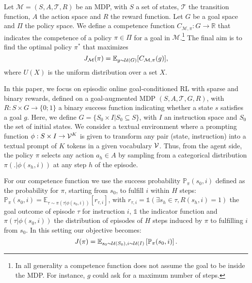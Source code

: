Let $\mathcal{M}=(S, A, \mathcal{T}, R)$ be an MDP, with $S$ a set of states, $\mathcal{T}$ the transition function, $A$ the action space and $R$ the reward function. Let $G$ be a goal space and $\Pi$ the policy space. We define a competence function $C_{\mathcal{M},\pi}: G %
\rightarrow \mathbb{R}$ that indicates the competence of a policy $\pi \in \Pi$ for a goal in $\mathcal{M}$.\footnote{In all generality a competence function does not assume the goal to be inside the MDP. For instance, $g$ could ask for a maximum number of steps.} The final aim is to find the optimal policy $\pi^*$ that maximizes
$$J_{\mathcal{M}}(\pi)=\mathbb{E}_{g \sim {\cal U}(G)} [C_{\mathcal{M}, \pi}(g)],$$ where $U(X)$ is the uniform distribution over a set $X$.

In this paper, we focus on episodic online goal-conditioned RL with sparse and binary rewards, defined on a goal-augmented MDP $(S, A, \mathcal{T}, G, R)$, with $R:S\times G \rightarrow \{0;1\}$ a binary success function indicating whether a state $s$ satisfies a goal $g$. Here, we define $G=\{S_0 \times I|S_0 \subseteq S\}$, with $I$ an instruction space and $S_0$ the set of initial states. We consider a textual environment where a prompting function $\phi:S\times I \rightarrow {\cal V}^K$ is given to transform any pair (state, instruction) into a textual prompt of $K$ tokens in a given vocabulary ${\cal V}$. Thus, from the agent side, the policy $\pi$ selects any action $a_h \in A$ by sampling from a categorical distribution $\pi(.|\phi(s_h, i))$ at any step $h$ of the episode.

For our competence function we use the success probability $\mathbb{P}_\pi(s_0,i)$ defined as the probability for $\pi$, starting from $s_0$, to fulfill $i$ within $H$ steps: $\mathbb{P}_\pi(s_0,i) = \mathbb{E}_{\tau \sim \pi(\tau|\phi(s_0,i))}[r_{\tau,i}]$, with $r_{\tau,i}=\mathds{1}(\exists s_h \in \tau, R(s_h,i)=1)$ the goal outcome of episode $\tau$  for instruction $i$,  %
$\mathds{1}$ the indicator function and
$\pi(\tau|\phi(s_0,i))$ the distribution of episodes of $H$ steps induced by $\pi$ to fulfilling $i$ from $s_0$. In this setting our objective becomes: 
$$J(\pi)=\mathbb{E}_{s_0 \sim {\cal U}(S_0), i \sim {\cal U}(I)} \left[\mathbb{P}_\pi(s_0,i) \right].$$   

